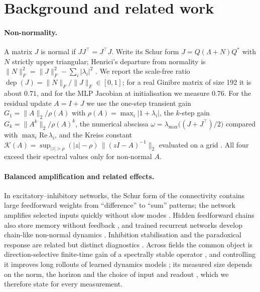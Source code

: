 \documentclass[10pt]{article}
\newcommand{\dep}{\operatorname{dep}}
\begin{document}
\section{Background and related work}
\label{sec:background}

\paragraph{Non-normality.} A matrix $J$ is normal if $JJ^\top=J^\top J$. Write its Schur form $J=Q(\Lambda+N)Q^*$ with $N$ strictly upper
triangular; Henrici's departure from normality is $\|N\|_F^2=\|J\|_F^2-\sum_i|\lambda_i|^2$ \citep{henrici1962bounds}. We report the
scale-free ratio $\dep(J)=\|N\|_F/\|J\|_F\in[0,1]$; for a real Ginibre matrix of size 192 it is about $0.71$, and for the MLP Jacobian at
initialisation we measure $0.76$. For the residual update $A=I+J$ we use the one-step transient gain $G_1=\|A\|_2/\rho(A)$ with
$\rho(A)=\max_i|1+\lambda_i|$, the $k$-step gain $G_k=\|A^k\|_2/\rho(A)^k$, the numerical abscissa
$\omega=\lambda_{\max}\big((J+J^\top)/2\big)$ compared with $\max_i\mathrm{Re}\,\lambda_i$, and the Kreiss constant
$\mathcal{K}(A)=\sup_{|z|>\rho}(|z|-\rho)\,\|(zI-A)^{-1}\|_2$ evaluated on a grid \citep{trefethen2005spectra}. All four exceed their
spectral values only for non-normal $A$.

\paragraph{Balanced amplification and related effects.} In excitatory--inhibitory networks, the Schur form of the connectivity contains
large feedforward weights from ``difference'' to ``sum'' patterns; the network amplifies selected inputs quickly without slow modes
\citep{murphy2009balanced}. Hidden feedforward chains also store memory without feedback \citep{goldman2009memory,ganguli2008memory}, and
trained recurrent networks develop chain-like non-normal dynamics \citep{orhan2019improved,kerg2019nonnormal,bondanelli2020coding,
christodoulou2022regimes}. Inhibition stabilisation and the paradoxical response are related but distinct diagnostics
\citep{ozeki2009inhibitory,rubin2015stabilized,sadeh2021inhibitory}. Across fields the common object is direction-selective finite-time
gain of a spectrally stable operator \citep{mccoy2013amplification,dixon2016transient,symon2018nonnormality,baggio2020efficient}, and
controlling it improves long rollouts of learned dynamics models \citep{pervez2026controlling}; its measured size depends
on the norm, the horizon and the choice of input and readout \citep{trefethen2005spectra,baggio2020efficient}, which we therefore state
for every measurement.
\end{document}
